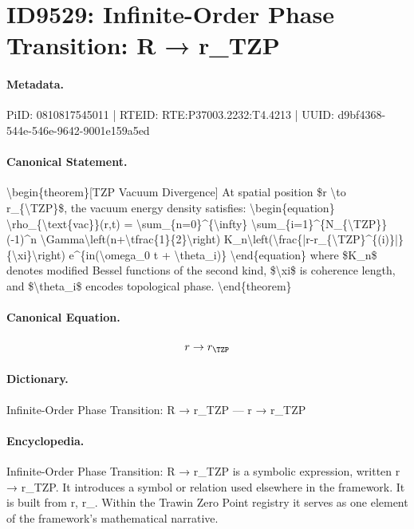 \section*{ID9529: Infinite-Order Phase Transition: R → r\_TZP}
\paragraph{Metadata.}
PiID: 0810817545011 | RTEID: RTE:P37003.2232:T4.4213 | UUID: d9bf4368-544e-546e-9642-9001e159a5ed

\paragraph{Canonical Statement.}
\textbackslash{}begin\{theorem\}[TZP Vacuum Divergence] At spatial position \$r \textbackslash{}to r\_\{\textbackslash{}TZP\}\$, the vacuum energy density satisfies: \textbackslash{}begin\{equation\} \textbackslash{}rho\_\{\textbackslash{}text\{vac\}\}(r,t) = \textbackslash{}sum\_\{n=0\}\textasciicircum{}\{\textbackslash{}infty\} \textbackslash{}sum\_\{i=1\}\textasciicircum{}\{N\_\{\textbackslash{}TZP\}\} (-1)\textasciicircum{}n \textbackslash{}Gamma\textbackslash{}left(n+\textbackslash{}tfrac\{1\}\{2\}\textbackslash{}right) K\_n\textbackslash{}left(\textbackslash{}frac\{|r-r\_\{\textbackslash{}TZP\}\textasciicircum{}\{(i)\}|\}\{\textbackslash{}xi\}\textbackslash{}right) e\textasciicircum{}\{in(\textbackslash{}omega\_0 t + \textbackslash{}theta\_i)\} \textbackslash{}end\{equation\} where \$K\_n\$ denotes modified Bessel functions of the second kind, \$\textbackslash{}xi\$ is coherence length, and \$\textbackslash{}theta\_i\$ encodes topological phase. \textbackslash{}end\{theorem\}

\paragraph{Canonical Equation.}
\[
r \to r_{\TZP}
\]

\paragraph{Dictionary.}
Infinite-Order Phase Transition: R → r\_TZP — r → r\_TZP

\paragraph{Encyclopedia.}
Infinite-Order Phase Transition: R → r\_TZP is a symbolic expression, written r → r\_TZP. It introduces a symbol or relation used elsewhere in the framework. It is built from r, r\_. Within the Trawin Zero Point registry it serves as one element of the framework's mathematical narrative.
